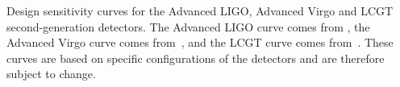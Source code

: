 Design sensitivity curves for the Advanced LIGO, Advanced Virgo
and LCGT second-generation detectors. The Advanced LIGO curve comes from
\cite{Harry:2010}, the Advanced Virgo curve comes
from~\cite{AdvVirgoweb}, and the LCGT curve comes
from~\cite{Arai:2009}. These curves are based on specific
configurations of the detectors and are therefore subject to change.